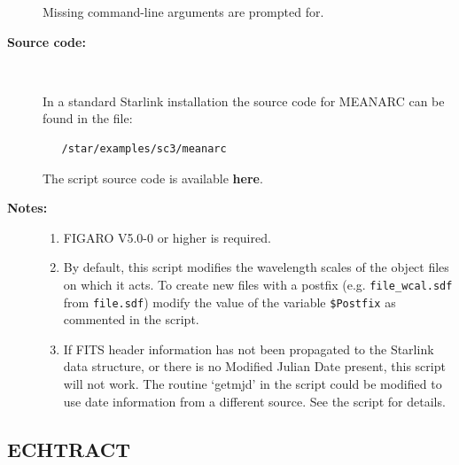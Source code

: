 \documentclass[twoside,11pt]{article}
\newcommand{\stardocinitials}  {SC}
\newcommand{\stardocnumber}    {3.2-0} %
\newcommand{\stardocname}{\stardocinitials /\stardocnumber}
\newcommand{\htmlref}[2]{#1}
\newcommand{\xlabel}[1]{}
\begin{document}
\begin{description}
\begin{enumerate}
\end{enumerate}

     Missing command-line arguments are prompted for.

\item [{\bf Source code:}] \mbox{} \\
\begin{latex}
In a standard Starlink installation the source code for MEANARC can be found
in the file:
\begin{verbatim}
   /star/examples/sc3/meanarc
\end{verbatim}
\end{latex}
\begin{htmlonly}
      The script source code is available
      \htmlref{{\bf here}}{se_meanarc_source}.
\end{htmlonly}

\newpage
\item [{\bf Notes:}] \mbox{}
\begin{enumerate}

\item FIGARO V5.0-0 or higher is required.

\item By default, this script modifies the wavelength scales of the
      object files on which it acts.  To create new files with a
      postfix (e.g. \verb+file_wcal.sdf+ from \verb+file.sdf+) modify the
      value of the variable \verb+$Postfix+ as commented in the
      script.  %

\item If FITS header information has not been propagated to the
      Starlink data structure, or there is no Modified Julian Date
      present, this script will not work.  The routine `getmjd' in
      the script could be modified to use date information from a
      different source.  See the script for details.

\end{enumerate}

\end{description}

\newpage
\subsection{\label{se_echtract}\xlabel{ECHTRACT}ECHTRACT}
\markboth{ECHTRACT}{\stardocname}
\end{document}
